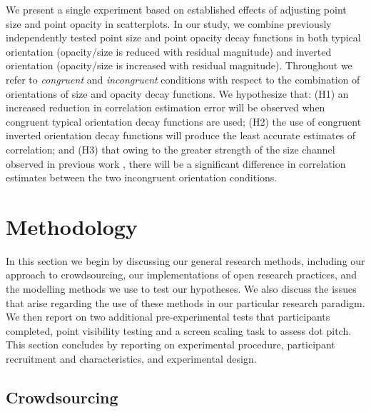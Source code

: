 \documentclass[manuscript, review, anonymous, screen]{acmart}
\begin{document}
We present a single experiment based on established effects of adjusting
point size and point opacity in scatterplots. In our study, we combine
previously independently tested point size and point opacity decay
functions in both typical orientation (opacity/size is reduced with
residual magnitude) and inverted orientation (opacity/size is increased
with residual magnitude). Throughout we refer to \emph{congruent} and
\emph{incongruent} conditions with respect to the combination of
orientations of size and opacity decay functions. We hypothesize that:
(H1) an increased reduction in correlation estimation error will be
observed when congruent typical orientation decay functions are used;
(H2) the use of congruent inverted orientation decay functions will
produce the least accurate estimates of correlation; and (H3) that owing
to the greater strength of the size channel observed in previous work
\citep{strain_2023b}, there will be a significant difference in
correlation estimates between the two incongruent orientation
conditions.

\hypertarget{sec-methods}{%
\section{Methodology}\label{sec-methods}}

In this section we begin by discussing our general research methods,
including our approach to crowdsourcing, our implementations of open
research practices, and the modelling methods we use to test our
hypotheses. We also discuss the issues that arise regarding the use of
these methods in our particular research paradigm. We then report on two
additional pre-experimental tests that participants completed, point
visibility testing and a screen scaling task to assess dot pitch. This
section concludes by reporting on experimental procedure, participant
recruitment and characteristics, and experimental design.

\hypertarget{sec-crowdsourcing}{%
\subsection{Crowdsourcing}\label{sec-crowdsourcing}}
\end{document}
